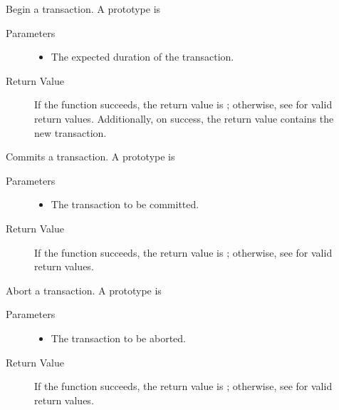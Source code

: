 %
%
\begin{description}
\item []
  Begin a transaction.
  A prototype is


  \begin{description}
    \item[Parameters] 
    \begin{itemize}
      \item {} The expected duration of the transaction.
    \end{itemize}
    \item[Return Value] 
      If the function succeeds, the return value is ; 
      otherwise, see  for valid return values. Additionally,
      on success, the return value contains the new transaction.
  \end{description}    
  
\item []
  Commits a transaction.
  A prototype is


  \begin{description}
    \item[Parameters]
    \begin{itemize}
      \item {} The transaction to be committed.
    \end{itemize}
    \item[ Return Value]
      If the function succeeds, the return value is ; 
      otherwise, see  for valid return values. 
  \end{description}  

\item []
  Abort a transaction.
  A prototype is


  \begin{description}
    \item[ Parameters]
    \begin{itemize}
      \item {} The transaction to be aborted.
    \end{itemize}
    \item[ Return Value]
      If the function succeeds, the return value is ; 
      otherwise, see  for valid return values. 
  \end{description}  
  

\end{description}
